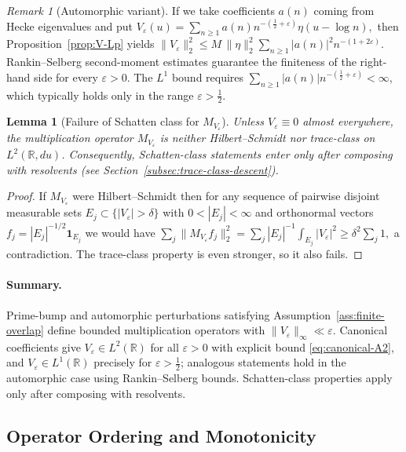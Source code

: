 ﻿\documentclass[12pt,a4paper]{article}
\newtheorem{lemma}[theorem]{Lemma}
\theoremstyle{definition}
\theoremstyle{remark}
\newtheorem{remark}[theorem]{Remark}
\newcommand{\RR}{\mathbb{R}}
\begin{document}
\begin{remark}[Automorphic variant]\label{rem:automorphic-V}
If we take coefficients $a(n)$ coming from Hecke eigenvalues and put
\(
  V_\varepsilon(u) = \sum_{n\ge1} a(n) n^{-(\frac12+\varepsilon)} \eta(u-\log n),
\)
then Proposition~\ref{prop:V-Lp} yields
\(
  \|V_\varepsilon\|_{2}^2 \le M\,\|\eta\|_{2}^2 \sum_{n\ge1}|a(n)|^2 n^{-(1+2\varepsilon)}.
\)
Rankin--Selberg second-moment estimates guarantee the finiteness of the right-hand side for every $\varepsilon>0$.  The $L^1$ bound requires $\sum_{n\ge1}|a(n)| n^{-(\frac12+\varepsilon)}<\infty$, which typically holds only in the range $\varepsilon>\tfrac12$.
\end{remark}

\begin{lemma}[Failure of Schatten class for $M_{V_\varepsilon}$]\label{lem:V-nonSchatten}
Unless $V_\varepsilon\equiv0$ almost everywhere, the multiplication operator $M_{V_\varepsilon}$ is neither Hilbert--Schmidt nor trace-class on $L^2(\RR,du)$.  Consequently, Schatten-class statements enter only after composing with resolvents (see Section~\ref{subsec:trace-class-descent}).
\end{lemma}

\begin{proof}
If $M_{V_\varepsilon}$ were Hilbert--Schmidt then for any sequence of pairwise disjoint measurable sets $E_j\subset\{ |V_\varepsilon|>\delta\}$ with $0<|E_j|<\infty$ and orthonormal vectors $f_j=|E_j|^{-1/2}\mathbf{1}_{E_j}$ we would have
\(
  \sum_j \|M_{V_\varepsilon} f_j\|_2^2 = \sum_j |E_j|^{-1} \int_{E_j} |V_\varepsilon|^2 \ge \delta^2 \sum_j 1,
\)
a contradiction.  The trace-class property is even stronger, so it also fails.
\end{proof}

\paragraph{Summary.}
Prime-bump and automorphic perturbations satisfying Assumption~\ref{ass:finite-overlap} define bounded multiplication operators with $\|V_\varepsilon\|_\infty\ll\varepsilon$.  Canonical coefficients give $V_\varepsilon\in L^2(\RR)$ for all $\varepsilon>0$ with explicit bound \eqref{eq:canonical-A2}, and $V_\varepsilon\in L^1(\RR)$ precisely for $\varepsilon>\tfrac12$; analogous statements hold in the automorphic case using Rankin--Selberg bounds.  Schatten-class properties apply only after composing with resolvents.

\subsection{Operator Ordering and Monotonicity}
\label{subsec:operator-ordering}
\end{document}
